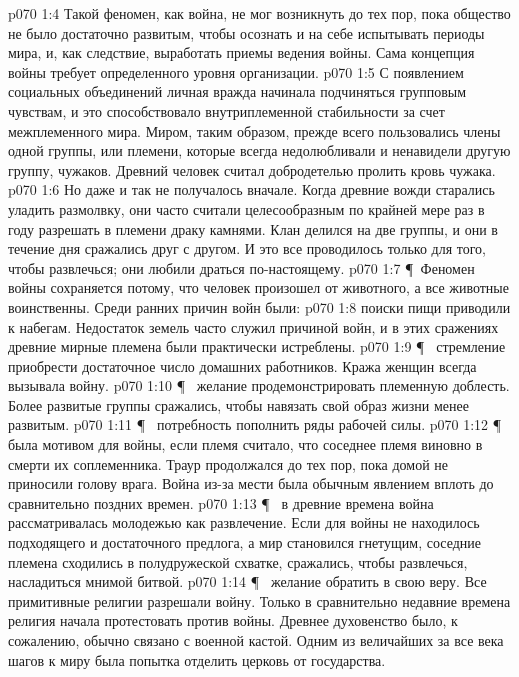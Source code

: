 \vs p070 1:4 Такой феномен, как война, не мог возникнуть до тех пор, пока общество не было достаточно развитым, чтобы осознать и на себе испытывать периоды мира, и, как следствие, выработать приемы ведения войны. Сама концепция войны требует определенного уровня организации.
\vs p070 1:5 С появлением социальных объединений личная вражда начинала подчиняться групповым чувствам, и это способствовало внутриплеменной стабильности за счет межплеменного мира. Миром, таким образом, прежде всего пользовались члены одной группы, или племени, которые всегда недолюбливали и ненавидели другую группу, чужаков. Древний человек считал добродетелью пролить кровь чужака.
\vs p070 1:6 Но даже и так не получалось вначале. Когда древние вожди старались уладить размолвку, они часто считали целесообразным по крайней мере раз в году разрешать в племени драку камнями. Клан делился на две группы, и они в течение дня сражались друг с другом. И это все проводилось только для того, чтобы развлечься; они любили драться по\hyp{}настоящему.
\vs p070 1:7 \P\ Феномен войны сохраняется потому, что человек произошел от животного, а все животные воинственны. Среди ранних причин войн были:
\vs p070 1:8 \bibnobreakspace {} поиски пищи приводили к набегам. Недостаток земель часто служил причиной войн, и в этих сражениях древние мирные племена были практически истреблены.
\vs p070 1:9 \P\ \bibnobreakspace {} стремление приобрести достаточное число домашних работников. Кража женщин всегда вызывала войну.
\vs p070 1:10 \P\ \bibnobreakspace {} желание продемонстрировать племенную доблесть. Более развитые группы сражались, чтобы навязать свой образ жизни менее развитым.
\vs p070 1:11 \P\ \bibnobreakspace {} потребность пополнить ряды рабочей силы.
\vs p070 1:12 \P\ \bibnobreakspace {} была мотивом для войны, если племя считало, что соседнее племя виновно в смерти их соплеменника. Траур продолжался до тех пор, пока домой не приносили голову врага. Война из\hyp{}за мести была обычным явлением вплоть до сравнительно поздних времен.
\vs p070 1:13 \P\ \bibnobreakspace {} в древние времена война рассматривалась молодежью как развлечение. Если для войны не находилось подходящего и достаточного предлога, а мир становился гнетущим, соседние племена сходились в полудружеской схватке, сражались, чтобы развлечься, насладиться мнимой битвой.
\vs p070 1:14 \P\ \bibnobreakspace {} желание обратить в свою веру. Все примитивные религии разрешали войну. Только в сравнительно недавние времена религия начала протестовать против войны. Древнее духовенство было, к сожалению, обычно связано с военной кастой. Одним из величайших за все века шагов к миру была попытка отделить церковь от государства.
